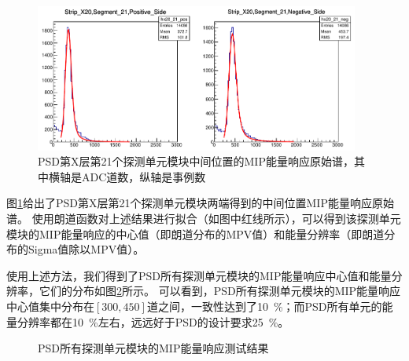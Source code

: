 \begin{figure}[htbp]
	\centering
	\includegraphics[width=0.95\textwidth]{chap/cosmic_ray/fig/mip_example.png}
	\caption{PSD第X层第21个探测单元模块中间位置的MIP能量响应原始谱，其中横轴是ADC道数，纵轴是事例数}
	\label{fig:cosmic_ray:mip_example}
\end{figure}
图\ref{fig:cosmic_ray:mip_example}给出了PSD第X层第21个探测单元模块两端得到的中间位置MIP能量响应原始谱。
使用朗道函数对上述结果进行拟合（如图中红线所示），可以得到该探测单元模块的MIP能量响应的中心值（即朗道分布的MPV值）和能量分辨率（即朗道分布的Sigma值除以MPV值）。

使用上述方法，我们得到了PSD所有探测单元模块的MIP能量响应中心值和能量分辨率，它们的分布如图\ref{fig:cosmic_ray:mip_results}所示。
可以看到，PSD所有探测单元模块的MIP能量响应中心值集中分布在$[300,450]$道之间，一致性达到了\SI{10}{\percent}；而PSD所有单元的能量分辨率都在\SI{10}{\percent}左右，远远好于PSD的设计要求\SI{25}{\percent}。
\begin{figure}[htb]
\centering
{}
\caption{PSD所有探测单元模块的MIP能量响应测试结果}
\label{fig:cosmic_ray:mip_results}
\end{figure}

